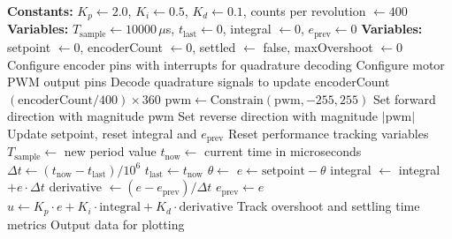 \begin{algorithm}
\caption{Variable Sample Rate Motor Control}
\label{alg:variable_sample_rate}
\begin{algorithmic}[1]
\State \textbf{Constants:} $K_p \gets 2.0$, $K_i \gets 0.5$, $K_d \gets 0.1$, counts per revolution $\gets 400$
\State \textbf{Variables:} $T_{\text{sample}} \gets 10000\,\mu$s, $t_{\text{last}} \gets 0$, integral $\gets 0$, $e_{\text{prev}} \gets 0$
\State \textbf{Variables:} setpoint $\gets 0$, encoderCount $\gets 0$, settled $\gets$ false, maxOvershoot $\gets 0$
\State
{}
    \State Configure encoder pins with interrupts for quadrature decoding
    \State Configure motor PWM output pins
\EndProcedure
\State
{} 
    \State Decode quadrature signals to update encoderCount
\EndProcedure
\State
{}
    \State \Return $(\text{encoderCount} / 400) \times 360$
\EndFunction
\State
{}
    \State $\text{pwm} \gets \text{Constrain}(\text{pwm}, -255, 255)$
        \State Set forward direction with magnitude pwm
    \Else
        \State Set reverse direction with magnitude $|\text{pwm}|$
    \EndIf
\EndProcedure
\State
{}
        \State Update setpoint, reset integral and $e_{\text{prev}}$
        \State Reset performance tracking variables
        \State $T_{\text{sample}} \gets$ new period value
    \EndIf
    \State
    \State $t_{\text{now}} \gets$ current time in microseconds
        \State $\Delta t \gets (t_{\text{now}} - t_{\text{last}}) / 10^6$ 
        \State $t_{\text{last}} \gets t_{\text{now}}$
        \State
        \State $\theta \gets$ 
        \State $e \gets \text{setpoint} - \theta$
        \State
        \State {}
        \State integral $\gets$ integral $+ e \cdot \Delta t$
        \State derivative $\gets (e - e_{\text{prev}}) / \Delta t$
        \State $e_{\text{prev}} \gets e$
        \State
        \State $u \gets K_p \cdot e + K_i \cdot \text{integral} + K_d \cdot \text{derivative}$
        \State {}
        \State
        \State Track overshoot and settling time metrics
        \State Output data for plotting
    \EndIf
\EndProcedure
\end{algorithmic}
\end{algorithm}

